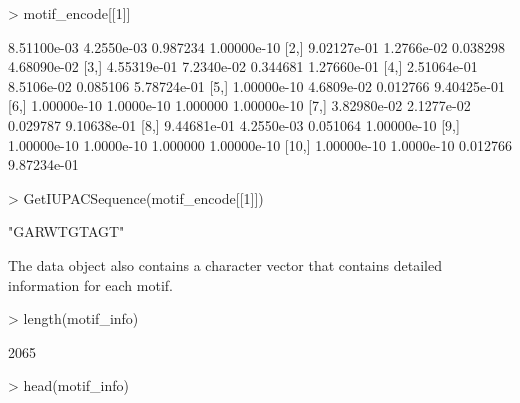 \documentclass[a4paper,10pt]{article}
\begin{document}
\begin{Schunk}
\begin{Sinput}
> motif_encode[[1]]
\end{Sinput}
\begin{Soutput}
             [,1]       [,2]     [,3]        [,4]
 [1,] 8.51100e-03 4.2550e-03 0.987234 1.00000e-10
 [2,] 9.02127e-01 1.2766e-02 0.038298 4.68090e-02
 [3,] 4.55319e-01 7.2340e-02 0.344681 1.27660e-01
 [4,] 2.51064e-01 8.5106e-02 0.085106 5.78724e-01
 [5,] 1.00000e-10 4.6809e-02 0.012766 9.40425e-01
 [6,] 1.00000e-10 1.0000e-10 1.000000 1.00000e-10
 [7,] 3.82980e-02 2.1277e-02 0.029787 9.10638e-01
 [8,] 9.44681e-01 4.2550e-03 0.051064 1.00000e-10
 [9,] 1.00000e-10 1.0000e-10 1.000000 1.00000e-10
[10,] 1.00000e-10 1.0000e-10 0.012766 9.87234e-01
\end{Soutput}
\begin{Sinput}
> GetIUPACSequence(motif_encode[[1]])
\end{Sinput}
\begin{Soutput}
[1] "GARWTGTAGT"
\end{Soutput}
\end{Schunk}

The data object  also contains a character vector  that contains detailed information for each motif.

\begin{Schunk}
\begin{Sinput}
> length(motif_info)
\end{Sinput}
\begin{Soutput}
[1] 2065
\end{Soutput}
\begin{Sinput}
> head(motif_info)
\end{Sinput}
\end{Schunk}
\end{document}
